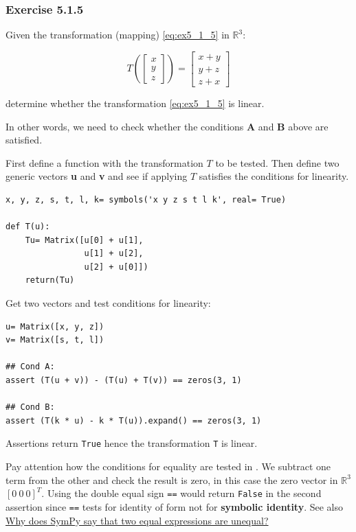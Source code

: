 \subsubsection{Exercise 5.1.5}

Given the transformation (mapping) \ref{eq:ex5_1_5} in $\mathbb{R}^3$:

\begin{equation}\label{eq:ex5_1_5}
T{\left (\left[\begin{matrix}x\\y\\z\end{matrix}\right] \right )} =
\left[\begin{matrix}x + y\\
                    y + z\\
                    z + x\end{matrix}\right]
\end{equation}

determine whether the transformation \ref{eq:ex5_1_5} is linear.

In other words, we need to check whether the conditions \textbf{A} and
\textbf{B} above are satisfied.

First define a function with the transformation $T$ to be tested. Then define two generic
vectors \textbf{u} and \textbf{v} and see if applying $T$ satisfies the conditions
for linearity.

\begin{verbatim}
x, y, z, s, t, l, k= symbols('x y z s t l k', real= True)

def T(u):
    Tu= Matrix([u[0] + u[1],
                u[1] + u[2],
                u[2] + u[0]])
    return(Tu)
\end{verbatim}

Get two vectors and test conditions for linearity:

\begin{verbatim}
u= Matrix([x, y, z])
v= Matrix([s, t, l])

## Cond A:
assert (T(u + v)) - (T(u) + T(v)) == zeros(3, 1)

## Cond B:
assert (T(k * u) - k * T(u)).expand() == zeros(3, 1)
\end{verbatim}

Assertions return \texttt{True} hence the transformation \texttt{T} is linear.

Pay attention how the conditions for equality are tested in \sympy. We subtract
one term from the other and check the result is zero, in this case the zero vector
in $\mathbb{R}^3$ $[0\ 0\ 0]^T$. Using the double equal sign \texttt{==} would return
\texttt{False} in the second assertion since \texttt{==} tests for identity of form
not for \textbf{symbolic identity}. See also \href{https://github.com/sympy/sympy/wiki/Faq}{
Why does SymPy say that two equal expressions are unequal?}

